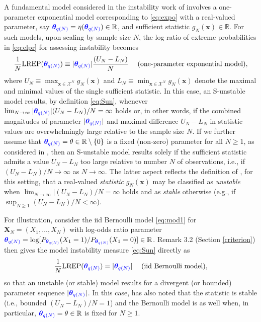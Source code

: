 \documentclass[numbib]{imamat}
\theoremstyle{theorem}
\theoremstyle{lemma}
\theoremstyle{example}
\theoremstyle{corollary}
\theoremstyle{definition}
\theoremstyle{remark}
\theoremstyle{approximation}
\theoremstyle{scheme}
\newcommand{\REP}{\mathrm{LREP}}
\newcommand{\thetaidx}{q(N)}
\newcommand{\thetaN}{\boldsymbol \theta_{\thetaidx}}
\newcommand{\ak}[1]{{\color{blue} #1}}
\begin{document}
A fundamental model considered in the instability work of \citet{schweinberger2011instability} involves a one-parameter exponential model corresponding to \eqref{eq:expo} with a real-valued parameter, say \(\ak{\thetaN} = \eta(\ak{\thetaN})\in \mathbb{R}\), and sufficient statistic \(g_N(\boldsymbol x)\in \mathbb{R}\).
For such models, upon scaling by sample size \(N\), the log-ratio of extreme probabilities in \eqref{eq:elpr} for assessing instability becomes
\begin{equation}
\label{eq:UL}
\frac{1}{N}\REP(\ak{\thetaN} ) \equiv   |\ak{\thetaN}| \frac{(U_N-L_N)}{N} \;\quad \text{(one-parameter exponential model)},
\end{equation}
where \(U_N \equiv \max_{\boldsymbol x\in\mathcal{X}^N}g_N(\boldsymbol x)\) and \(L_N \equiv \min_{\boldsymbol x\in\mathcal{X}^N}g_N(\boldsymbol x)\) denote the maximal and minimal values of the single sufficient statistic. In this case, an S-unstable model results, by definition \eqref{eq:Sun}, whenever \(\lim_{N\to \infty} |\ak{\thetaN}| (U_N-L_N)/N= \infty\) holds or, in other words, if the combined magnitudes of parameter \(|\ak{\thetaN}|\) and maximal difference \(U_N-L_N\) in statistic values are overwhelmingly large relative to the sample size \(N\). If we further assume that \(\ak{\thetaN} =\theta\in\mathbb{R}\setminus \{0\}\) is a fixed (non-zero) parameter for all \(N \geq 1\), as considered in \citet{schweinberger2011instability}, then an S-unstable model results solely if the sufficient statistic admits a value \(U_N-L_N\) too large relative to number \(N\) of observations, i.e., if \((U_N-L_N)/N\to \infty\) as \(N\to \infty\). The latter aspect reflects the definition of \citet{schweinberger2011instability}, for this setting, that a real-valued \emph{statistic} \(g_N(\boldsymbol x)\) may be classified as \emph{unstable} when \(\lim_{N\to \infty}|(U_N-L_N)/N=\infty\) holds and as \emph{stable} otherwise (e.g., if \(\sup_{N \geq 1}(U_N-L_N)/N<\infty\)).

For illustration, consider the iid Bernoulli model \eqref{eq:mod1} for \(\boldsymbol X_N=(X_1,\ldots,X_N)\) with log-odds ratio parameter \(\ak{\thetaN} = \log[ P_{\ak{\thetaN}}(X_1=1)/ P_{\ak{\thetaN}}(X_1=0)]\in\mathbb{R}\). \ak{Remark 3.2} (Section \ref{criterion}) then gives the model instability measure \eqref{eq:Sun} directly as
\[
\frac{1}{N}\REP(\ak{\thetaN} ) = |\ak{\thetaN}|\quad\; \text{(iid Bernoulli model)},
\]
so that an unstable (or stable) model results for a divergent (or bounded) parameter sequence \(|\ak{\thetaN}|\).
\ak{In this case}, \citet{schweinberger2011instability} has also noted that the statistic is stable (i.e., bounded \((U_N-L_N)/N=1\)) and the Bernoulli model is as well when, in particular, \(\ak{\thetaN}=\theta \in\mathbb{R}\) is fixed for \(N \geq 1\).
\end{document}
